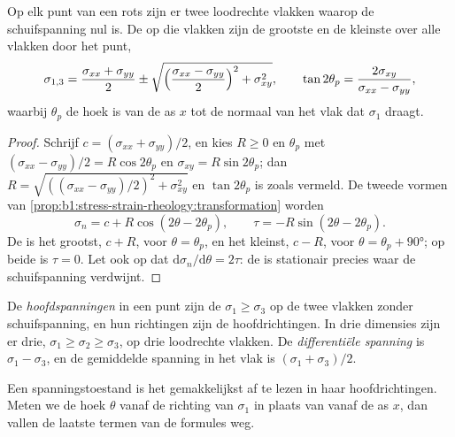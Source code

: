 \begin{theorem}[Hoofdspanningen]\label{thm:b1:stress-strain-rheology:principal}
Op elk punt van een rots zijn er twee loodrechte vlakken waarop de schuifspanning nul is. De  op die vlakken zijn de grootste en de kleinste  over alle vlakken door het punt,
\[
  \sigma_{1,3} = \frac{\sigma_{xx}+\sigma_{yy}}{2} \pm
  \sqrt{\Bigl(\frac{\sigma_{xx}-\sigma_{yy}}{2}\Bigr)^2 + \sigma_{xy}^2},
  \qquad \tan2\theta_p = \frac{2\sigma_{xy}}{\sigma_{xx}-\sigma_{yy}},
\]
waarbij $\theta_p$ de hoek is van de as $x$ tot de normaal van het vlak dat $\sigma_1$ draagt.
\end{theorem}

\begin{proof}
Schrijf $c = (\sigma_{xx}+\sigma_{yy})/2$, en kies $R \ge 0$ en $\theta_p$ met $(\sigma_{xx}-\sigma_{yy})/2 = R\cos2\theta_p$ en $\sigma_{xy} = R\sin2\theta_p$; dan
$R = \sqrt{((\sigma_{xx}-\sigma_{yy})/2)^2 + \sigma_{xy}^2}$ en $\tan2\theta_p$ is zoals vermeld. De tweede vormen van \cref{prop:b1:stress-strain-rheology:transformation} worden
\[
  \sigma_n = c + R\cos(2\theta - 2\theta_p), \qquad \tau = -R\sin(2\theta - 2\theta_p).
\]
De  is het grootst, $c + R$, voor $\theta = \theta_p$, en het kleinst, $c - R$, voor $\theta = \theta_p + \ang{90}$; op beide is $\tau = 0$. Let ook op dat $\mathrm d\sigma_n/\mathrm d\theta = 2\tau$: de  is stationair precies waar de schuifspanning verdwijnt.
\end{proof}

\begin{definition}\label{def:b1:stress-strain-rheology:principal}
De \emph{hoofdspanningen} in een punt zijn de  $\sigma_1 \ge \sigma_3$ op de twee vlakken zonder schuifspanning, en hun richtingen zijn de hoofdrichtingen. In drie dimensies zijn er drie, $\sigma_1 \ge \sigma_2 \ge \sigma_3$, op drie loodrechte vlakken. De \emph{differentiële spanning} is $\sigma_1 - \sigma_3$, en de gemiddelde spanning in het vlak is $(\sigma_1+\sigma_3)/2$.
\end{definition}

Een spanningstoestand is het gemakkelijkst af te lezen in haar hoofdrichtingen. Meten we de hoek $\theta$ vanaf de richting van $\sigma_1$ in plaats van vanaf de as $x$, dan vallen de laatste termen van de formules weg.


